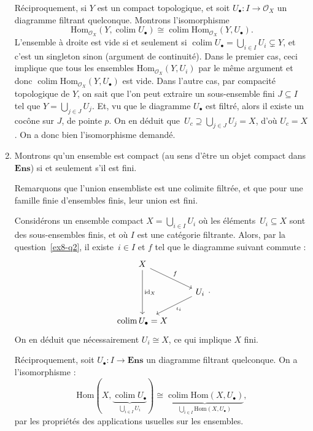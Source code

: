 \documentclass{../../td}
\newcommand\id{\ensuremath{\operatorname{id}}}
\newcommand\colim{\ensuremath{\operatorname{colim}}}
\begin{document}
\begin{enumerate}
      Réciproquement, si $Y$ est un compact topologique, et soit $U_\bullet : I \to \mathcal{O}_X$ un diagramme filtrant quelconque.
      Montrons l'isomorphisme \[
        \mathrm{Hom}_{\mathcal{O}_X}(Y, \colim U_\bullet) \cong \colim \mathrm{Hom}_{\mathcal{O}_X}(Y, U_\bullet)
      .\] 
      L'ensemble à droite est vide si et seulement si $\colim U_\bullet = \bigcup_{i \in  I} U_i \subsetneq Y$, et c'est un singleton sinon (argument de continuité).
      Dans le premier cas, ceci implique que tous les ensembles $\mathrm{Hom}_{\mathcal{O}_X}(Y, U_i)$ par le même argument et donc $\colim \mathrm{Hom}_{\mathcal{O}_X}(Y, U_\bullet)$ est vide.
      Dans l'autre cas, par compacité topologique de $Y$, on sait que l'on peut extraire un sous-ensemble fini $J \subseteq I$ tel que $Y = \bigcup_{j \in  J} U_j$.
      Et, vu que le diagramme $U_\bullet$ est filtré, alors il existe un cocône sur $J$, de pointe $p$.
      On en déduit que~$U_c \supseteq \bigcup_{j \in J}U_j = X$, d'où $U_c = X$.
      On a donc bien l'isomorphisme demandé.


    \item Montrons qu'un ensemble est compact (au sens d'être un objet compact dans $\mathbf{Ens}$) si et seulement s'il est fini.

      Remarquons que l'union ensembliste est une colimite filtrée, et que pour une famille finie d'ensembles finis, leur union est fini.

      Considérons un ensemble compact $X = \bigcup_{i \in  I} U_i$ où les éléments~$U_i \subseteq X$ sont des sous-ensembles finis, et où $I$ est une catégorie filtrante.
      Alors, par la question~\ref{ex8-q2}, il existe~$i \in I$ et $f$ tel que le diagramme suivant commute :
      \[
      \begin{tikzcd}
        X \arrow{dd}{\id_X} \arrow{dr}{f} \\
        & U_i \arrow{dl}{\iota_i} \\
        \colim U_\bullet = X
      \end{tikzcd}
      .\]
      On en déduit que nécessairement $U_i \cong X$, ce qui implique $X$ fini.

      Réciproquement, soit $U_\bullet : I \to \mathbf{Ens}$  un diagramme filtrant quelconque.
      On a l'isomorphisme : \[
        \mathrm{Hom}(X, \underbrace{\colim U_\bullet}_{\bigcup_{i \in  I} U_i}) \cong \underbrace{\colim \mathrm{Hom}(X, U_\bullet)}_{\bigcup_{i \in  I} \mathrm{Hom}(X, U_\bullet)}
      ,\]
      par les propriétés des applications usuelles sur les ensembles.




\end{enumerate}
\end{document}
